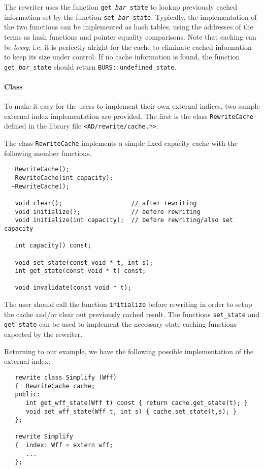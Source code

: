 The rewriter uses the function {\tt get\_{\em bar}\_state} to lookup
previously cached information set by the function {\tt set\_{\em bar}\_state}.
Typically, the implementation of the two functions can be implemented
as hash tables, using the addresses of the terms as hash functions and
pointer equality comparisons.   Note that caching can be {\em lossy}; i.e.
it is perfectly alright for the cache to eliminate cached information to
keep its size under control.  If no cache information is found,
the function {\tt get\_{\em bar}\_state} should return 
\verb|BURS::undefined_state|.

\paragraph{Class }
   To make it easy for the users to implement their own external indices,
two sample external index implementation are provided.  The first
is the class \verb|RewriteCache| defined in the library file 
\verb|<AD/rewrite/cache.h>|.  

   The class \verb|RewriteCache| implements a simple fixed capacity
   cache with the following member functions.
\begin{verbatim}
   RewriteCache();
   RewriteCache(int capacity);
  ~RewriteCache();
 
   void clear();                   // after rewriting
   void initialize();              // before rewriting
   void initialize(int capacity);  // before rewriting/also set capacity
   
   int capacity() const; 
               
   void set_state(const void * t, int s);
   int get_state(const void * t) const;

   void invalidate(const void * t); 
\end{verbatim}

The user should call the function \verb|initialize| before rewriting
in order to setup the cache and/or clear out previously cached result.
The functions \verb|set_state| and \verb|get_state| can be used to
implement the necessary state caching functions expected by the rewriter.

Returning to our  example, we have the following possible implementation
of the external index:
\begin{verbatim}
   rewrite class Simplify (Wff)
   {  RewriteCache cache;
   public:
      int get_wff_state(Wff t) const { return cache.get_state(t); }
      void set_wff_state(Wff t, int s) { cache.set_state(t,s); }  
   };

   rewrite Simplify
   {  index: Wff = extern wff;
      ...
   };
\end{verbatim}

